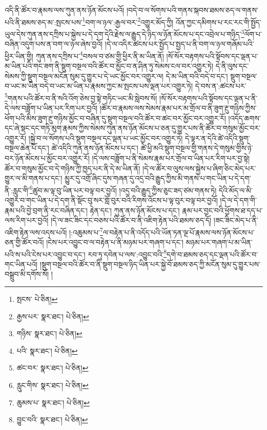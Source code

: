 འདི་ནི་ཚོར་བ་རྣམས་ལས་ཀུན་ནས་ཉོན་མོངས་པའོ། །བདེ་བ་ལ་སོགས་པའི་གནས་སྐབས་ཐམས་ཅད་ལ་གནས་པའི་ནི་ཐམས་ཅད་མ་:སྤངས་པས་\footnote{སྤངས་  པེ་ཅིན། }བག་ལ་ཉལ་:རྒྱལ་བར་\footnote{རྒྱས་པར་  སྣར་ཐང་།  པེ་ཅིན། }འགྱུར་མོད་ཀྱི། འོན་ཀྱང་དམིགས་པ་རང་རང་གི་སྤྱོད་ཡུལ་དེས་ཀུན་ནས་དཀྲིས་པ་སྐྱེས་པ་དེ་དག་དེའི་རྗེས་ལ་རྒྱུད་དེ་ཉིད་ལ་ཉོན་མོངས་པ་དང་འབྲེལ་པ་གཉིད་\footnote{གཉིས་  སྣར་ཐང་།  པེ་ཅིན། }ལོག་པ་བཞིན་འདུག་པས་ན་བག་ལ་ཉལ་ཞེས་བྱའོ། །དེ་ལ་འདིར་ཚངས་པར་སྤྱོད་པ་སྤྱད་པ་ནི་བག་ལ་ཉལ་གཞོམ་པའི་ཕྱིར་ཡིན་གྱི། ཀུན་ནས་དཀྲིས་པ་\footnote{པའི་  སྣར་ཐང་།  པེ་ཅིན། }བསལ་བ་ཙམ་གྱི་ཕྱིར་ནི་མ་ཡིན་ནོ། །སོ་སོར་བརྟགས་པའི་སྟོབས་དང་ལྡན་པ་མ་ཡིན་པའི་གང་ཟག་ནི་སྡུག་བསྔལ་བའི་ཚོར་བ་མྱོང་བ་ན་ཤིན་ཏུ་སེམས་ངལ་བར་འགྱུར་ཏེ། དེ་ནི་ལུས་དང་སེམས་ཀྱི་སྡུག་བསྔལ་མངོན་སུམ་དུ་གྱུར་པ་དེ་ཡང་མྱོང་བར་འགྱུར་ལ། དེ་མ་ཡིན་བའི་བདེ་བ་དང་། སྡུག་བསྔལ་བ་ཡང་མ་ཡིན་བདེ་བ་ཡང་མ་ཡིན་པ་རྣམས་ཀྱང་མ་སྤངས་པས་ལྡན་པར་འགྱུར་ཏེ། དེ་བས་ན་:ཚངས་པར་\footnote{ཚང་བར་  སྣར་ཐང་།  པེ་ཅིན། }གནས་པའི་ཚོར་བ་ནི་སའི་འོག་ཅེས་བྱ་སྟེ་གཏིང་ཡང་མི་སླེབས་སོ། །སོ་སོར་བརྟགས་པའི་སྟོབས་དང་ལྡན་པ་ནི་དེ་ལས་བཟློག་པ་ཡིན་པར་རིག་པར་བྱའོ། །ཚོར་བ་རྣམས་ལས་སེམས་རྣམ་པར་མ་གྲོལ་བ་ནི་ཟུག་རྔུ་གཉིས་ཀྱིས་ཕོག་པའི་མིས་ཟུག་རྔུ་གཉིས་མྱོང་བ་བཞིན་དུ་སྡུག་བསྔལ་བའི་ཚོར་བ་ཚང་བར་མྱོང་བར་འགྱུར་རོ། །འདོད་ཆགས་དང་ཞེ་སྡང་དང་གཏི་མུག་རྣམས་ཀྱིས་སེམས་ཀུན་ནས་ཉོན་མོངས་པ་ཅན་དུ་གྱུར་པས་ནི་ཚོར་བ་གསུམ་མྱོང་བར་འགྱུར་རོ། །སྐྱེ་བ་ལ་སོགས་པའི་སྡུག་བསྔལ་དང་ལྡན་པ་ཡང་མྱོང་བར་འགྱུར་ཏེ། དེ་ལྟར་ན་དེའི་ཚེ་འདིའི་སྡུག་བསྔལ་ཆེན་པོ་དང་། ཚེ་འདིའི་ཀུན་ནས་ཉོན་མོངས་པ་དང་། ཚེ་ཕྱི་མའི་སྡུག་བསྔལ་གྱི་གནས་དེ་གསུམ་གྱིས་ཉེ་བར་ཉོན་མོངས་པ་མྱོང་བར་འགྱུར་རོ། །དེ་ལས་བཟློག་པ་ནི་སེམས་རྣམ་པར་གྲོལ་བ་ཡིན་པར་རིག་པར་བྱ་སྟེ། ཚོར་བ་གསུམ་མྱོང་བ་དེ་གཉིས་ཀྱི་ཁྱད་པར་ནི་དེ་མ་ཡིན་ནོ། །དེ་ལ་ཚོར་བ་ལུས་ལས་སྐྱེས་པ་ཞིག་ཅིང་མེད་པར་གྱུར་ལ་མི་གནས་པ་དང་། མྱུར་དུ་འགྲོ་ཞིང་དུས་གཞན་དུ་འདྲ་བའི་རྒྱུད་ཀྱིས་མི་གནས་པ་གང་ཡིན་པ་དེ་དག་ནི་:རླུང་གི་\footnote{རླུང་གིས་  སྣར་ཐང་།  པེ་ཅིན། }ཚུབ་མ་ལྟ་བུ་ཡིན་པར་བལྟ་བར་བྱའོ། །འདྲ་བའི་རྒྱུད་ཀྱིས་ཅུང་ཟད་ཙམ་གནས་ཏེ། དེའི་མོད་ལ་མི་འགྱུར་བ་གང་ཡིན་པ་དེ་དག་ནི་སྡོང་བུ་སར་གློ་བུར་བའི་རིགས་འོངས་པ་ལྟ་བུར་བལྟ་བར་བྱའོ། །དེ་ལ་དེ་དག་གི་རྣམ་པའི་བྱེ་བྲག་ནི་རང་བཞིན་དང་། རྟེན་དང་། ཀུན་ནས་ཉོན་མོངས་པ་དང་། རྣམ་པར་བྱང་བའི་ཕྱོགས་ཐ་དད་པ་ལས་རིག་པར་བྱའོ། །དེ་ལ་ཟང་ཟིང་དང་བཅས་པའི་ཚོར་བ་ནི་འཇིག་རྟེན་པའི་ཐམས་ཅད་དོ། །ཟང་ཟིང་མེད་པ་ནི་འཇིག་རྟེན་ལས་འདས་པའོ། །:འཆུམས་པ་\footnote{ཆུམས་པ་  སྣར་ཐང་།  པེ་ཅིན། }ལ་བརྟེན་པ་ནི་འདོད་པའི་ཡོན་ཏན་ལྔ་པོ་རྣམས་ལས་ཉོན་མོངས་པ་ཅན་གྱི་ཚོར་བའོ། །ངེས་པར་འབྱུང་བ་ལ་བརྟེན་པ་ནི་མཉམ་པར་གཞག་པ་དང་། མཉམ་པར་གཞག་པ་མ་ཡིན་པའི་ས་པའི་ངེས་པར་འབྱུང་བ་དང་། རབ་ཏུ་དབེན་པ་ལས་:འབྱུང་བའི་\footnote{བྱུང་བའི་  སྣར་ཐང་།  པེ་ཅིན། }དགེ་བ་ཐམས་ཅད་དང་ལྡན་པའི་ཚོར་བ་གང་ཡིན་པའོ། །སྡུག་བསྔལ་བའི་ཚོར་བ་ནི་སྡུག་བསྔལ་ཉིད་ཡིན་པར་སྐྱེ་བོ་ཐམས་ཅད་ཀྱི་མངོན་སུམ་དུ་གྱུར་པས་བསྒྲུབ་མི་དགོས་སོ། །
